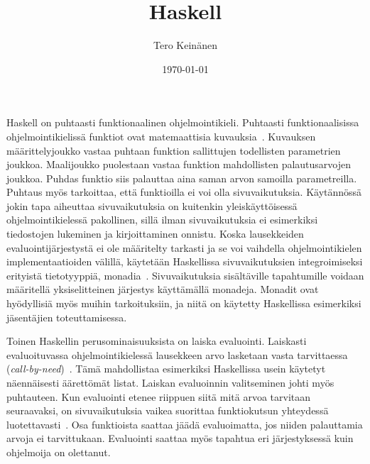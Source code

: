 \documentclass[english, finnish]{tktltiki2}
\title{Haskell}
\author{Tero Keinänen}
\date{\today}
\theoremstyle{definition}
\theoremstyle{remark}
\begin{document}

\frontmatter      %

\maketitle        %



\mainmatter       %


Haskell on puhtaasti funktionaalinen ohjelmointikieli. Puhtaasti funktionaalisissa ohjelmointikielissä funktiot ovat matemaattisia kuvauksia~\cite[s.~1]{Sab98}. Kuvauksen määrittelyjoukko vastaa puhtaan funktion sallittujen todellisten parametrien joukkoa. Maalijoukko puolestaan vastaa funktion mahdollisten palautusarvojen joukkoa. Puhdas funktio siis palauttaa aina saman arvon samoilla parametreilla. Puhtaus myös tarkoittaa, että funktioilla ei voi olla sivuvaikutuksia. Käytännössä jokin tapa aiheuttaa sivuvaikutuksia on kuitenkin yleiskäyttöisessä ohjelmointikielessä pakollinen, sillä ilman sivuvaikutuksia ei esimerkiksi tiedostojen lukeminen ja kirjoittaminen onnistu. Koska lausekkeiden evaluointijärjestystä ei ole määritelty tarkasti ja se voi vaihdella ohjelmointikielen implementaatioiden välillä, käytetään Haskellissa sivuvaikutuksien integroimiseksi erityistä tietotyyppiä, monadia~\cite[luku~7]{Mar10}. Sivuvaikutuksia sisältäville tapahtumille voidaan määritellä yksiselitteinen järjestys käyttämällä monadeja. Monadit ovat hyödyllisiä myös muihin tarkoituksiin, ja niitä on käytetty Haskellissa esimerkiksi jäsentäjien toteuttamisessa.

Toinen Haskellin perusominaisuuksista on laiska evaluointi. Laiskasti evaluoituvassa ohjelmointikielessä lausekkeen arvo lasketaan vasta tarvittaessa (\emph{call-by-need})~\cite[s.~12-8]{Hud07}. Tämä mahdollistaa esimerkiksi Haskellissa usein käytetyt näennäisesti äärettömät listat. Laiskan evaluoinnin valitseminen johti myös puhtauteen. Kun evaluointi etenee riippuen siitä mitä arvoa tarvitaan seuraavaksi, on sivuvaikutuksia vaikea suorittaa funktiokutsun yhteydessä luotettavasti~\cite[s.~12-8]{Hud07}. Osa funktioista saattaa jäädä evaluoimatta, jos niiden palauttamia arvoja ei tarvittukaan. Evaluointi saattaa myös tapahtua eri järjestyksessä kuin ohjelmoija on olettanut.
\end{document}
